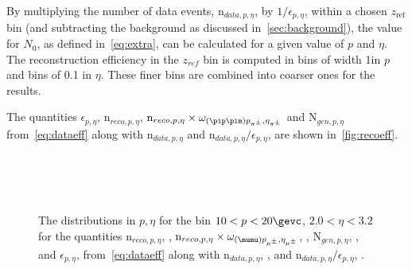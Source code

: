  
By multiplying the number of data events, $\textrm{n}_{data, p, \eta}$, by $1/\epsilon_{p,\eta}$, within a chosen $z_{\mathrm{ref}}$ bin (and subtracting the background as discussed in~\autoref{sec:background}), the value for $N_{0}$, as defined in~\autoref{eq:extra}, can be calculated for a given value of $p$ and $\eta$. The reconstruction efficiency in the $z_{ref}$ bin is computed in bins of width 1\gevc in $p$ and bins of 0.1 in $\eta$.  These finer bins are combined into coarser ones for the results. %

The quantities $\epsilon_{p,\eta}$, $\textrm{n}_{reco, p, \eta}$, $\textrm{n}_{reco, p, \eta}\times \omega_{(\pip\pim)p_{\pi^{\pm}},\eta_{\pi^{\pm}}}$ and $\textrm{N}_{gen, p, \eta}$ from~\autoref{eq:dataeff} along with $\textrm{n}_{data, p, \eta}$ and $\textrm{n}_{data, p, \eta}/\epsilon_{p,\eta}$, are shown in~\autoref{fig:recoeff}.



 
\begin{figure}[h!]
  \begin{center}
   \vspace*{-1.5cm}
    \\
    \\
    \\
        
\end{center}
  \caption{The distributions in $p,\eta$ for the bin $10<p<20 \gevc$, $2.0<\eta<3.2$ for the quantities $\textrm{n}_{reco, p, \eta}$, \protect{}, $\textrm{n}_{reco, p, \eta}\times \omega_{(\mumu)p_{\mu^{\pm}},\eta_{\mu^{\pm}}}$, \protect{}, $\textrm{N}_{gen, p, \eta}$, \protect{}, and $\epsilon_{p,\eta}$, \protect{} from~\autoref{eq:dataeff} along with $\textrm{n}_{data, p, \eta}$, \protect{}, and $\textrm{n}_{data, p, \eta}/\epsilon_{p,\eta}$, \protect{}.
    \label{fig:recoeff}}
\end{figure}

